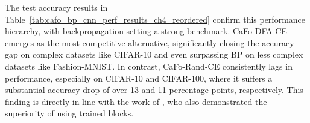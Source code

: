 The test accuracy results in Table~\ref{tab:cafo_bp_cnn_perf_results_ch4_reordered} confirm this performance hierarchy, with backpropagation setting a strong benchmark. CaFo-DFA-CE emerges as the most competitive alternative, significantly closing the accuracy gap on complex datasets like CIFAR-10 and even surpassing BP on less complex datasets like Fashion-MNIST. In contrast, CaFo-Rand-CE consistently lags in performance, especially on CIFAR-10 and CIFAR-100, where it suffers a substantial accuracy drop of over 13 and 11 percentage points, respectively. This finding is directly in line with the work of \cite{zhao2023cafo}, who also demonstrated the superiority of using trained blocks.

\begin{table}[htbp]
    \centering
    \caption{Efficiency Comparison: CaFo Variants vs. BP on Native 3-block CNN (Mean ± Std Dev over 3 runs).}
    \label{tab:cafo_bp_cnn_eff_results_ch4_reordered_eff}
\end{table}
